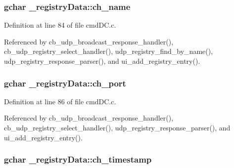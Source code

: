 \subsubsection[{\texorpdfstring{ch\+\_\+name}{ch_name}}]{\setlength{\rightskip}{0pt plus 5cm}gchar \+\_\+registry\+Data\+::ch\+\_\+name}\hypertarget{struct__registry_data_a4764e2a72c3ba9177b6c4803cfa03f72}{}\label{struct__registry_data_a4764e2a72c3ba9177b6c4803cfa03f72}


Definition at line 84 of file cmd\+D\+C.\+c.



Referenced by cb\+\_\+udp\+\_\+broadcast\+\_\+response\+\_\+handler(), cb\+\_\+udp\+\_\+registry\+\_\+select\+\_\+handler(), udp\+\_\+registry\+\_\+find\+\_\+by\+\_\+name(), udp\+\_\+registry\+\_\+response\+\_\+parser(), and ui\+\_\+add\+\_\+registry\+\_\+entry().

\subsubsection[{\texorpdfstring{ch\+\_\+port}{ch_port}}]{\setlength{\rightskip}{0pt plus 5cm}gchar \+\_\+registry\+Data\+::ch\+\_\+port}\hypertarget{struct__registry_data_a74f03616af9ec9770266cb7988fe1a71}{}\label{struct__registry_data_a74f03616af9ec9770266cb7988fe1a71}


Definition at line 86 of file cmd\+D\+C.\+c.



Referenced by cb\+\_\+udp\+\_\+broadcast\+\_\+response\+\_\+handler(), cb\+\_\+udp\+\_\+registry\+\_\+select\+\_\+handler(), udp\+\_\+registry\+\_\+response\+\_\+parser(), and ui\+\_\+add\+\_\+registry\+\_\+entry().

\subsubsection[{\texorpdfstring{ch\+\_\+timestamp}{ch_timestamp}}]{\setlength{\rightskip}{0pt plus 5cm}gchar \+\_\+registry\+Data\+::ch\+\_\+timestamp}\hypertarget{struct__registry_data_a362a4edf89daafe79565053dd70892c4}{}\label{struct__registry_data_a362a4edf89daafe79565053dd70892c4}



